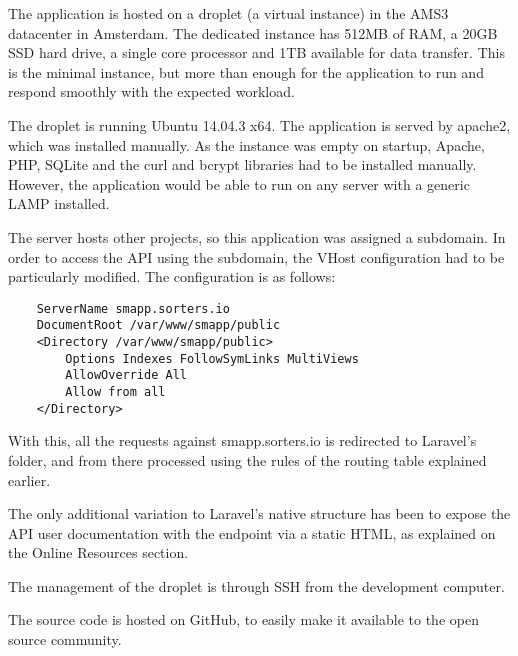 The application is hosted on a droplet (a virtual instance) in the AMS3 datacenter in Amsterdam. The dedicated instance has 512MB of RAM, a 20GB SSD hard drive, a single core processor and 1TB available for data transfer. This is the minimal instance, but more than enough for the application to run and respond smoothly with the expected workload.

The droplet is running Ubuntu 14.04.3 x64. The application is served by apache2, which was installed manually. As the instance was empty on startup, Apache, PHP, SQLite and the curl and bcrypt libraries had to be installed manually. However, the application would be able to run on any server with a generic LAMP installed.

The server hosts other projects, so this application was assigned a subdomain. In order to access the API using the subdomain, the VHost configuration had to be particularly modified. The configuration is as follows:

\begin{verbatim}
	ServerName smapp.sorters.io
	DocumentRoot /var/www/smapp/public
	<Directory /var/www/smapp/public>
		Options Indexes FollowSymLinks MultiViews
		AllowOverride All
		Allow from all
	</Directory>
\end{verbatim}

With this, all the requests against smapp.sorters.io is redirected to Laravel’s  folder, and from there processed using the rules of the routing table explained earlier.

The only additional variation to Laravel’s native structure has been to expose the API user documentation with the  endpoint via a static HTML, as explained on the Online Resources section.

The management of the droplet is through SSH from the development computer.

The source code is hosted on GitHub, to easily make it available to the open source community.